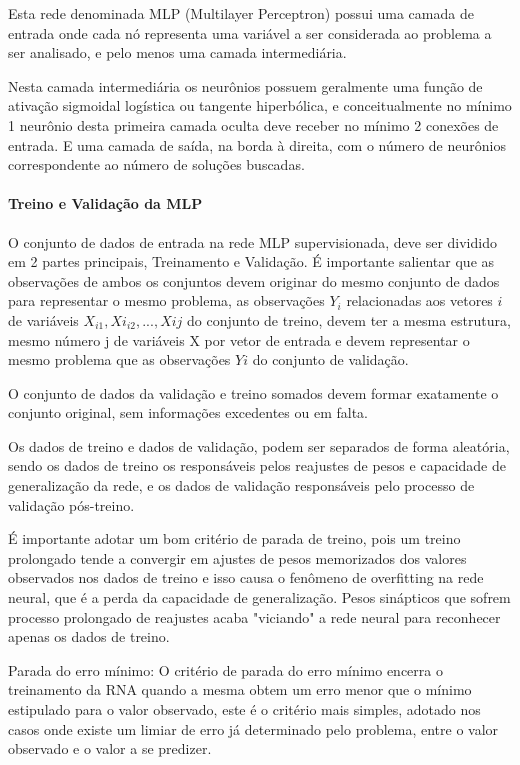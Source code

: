 \documentclass[	12pt, Times, openright, twoside, a4paper, english, brazil]{abntex2}
\begin{document}
  	       Esta rede denominada MLP (Multilayer Perceptron) possui uma camada de entrada onde cada nó representa uma variável a ser considerada ao problema a ser analisado, e pelo menos uma camada intermediária.
  	      
  	       Nesta camada intermediária os neurônios possuem geralmente uma função de ativação sigmoidal logística ou tangente hiperbólica, e conceitualmente no mínimo 1 neurônio desta primeira camada oculta deve receber no mínimo 2 conexões de entrada. E uma camada de saída, na borda à direita, com o número de neurônios correspondente ao número de soluções buscadas. 
  	       
            \paragraph{Treino e Validação da MLP}
            	O conjunto de dados de entrada na rede MLP supervisionada, deve ser dividido em 2 partes principais, Treinamento e Validação. É importante salientar que as observações de ambos os conjuntos devem originar do mesmo conjunto de dados para representar o mesmo problema, as observações $Y_i$ relacionadas aos vetores $i$ de variáveis $X_{i1},Xi_{i2},...,X{ij}$ do conjunto de treino, devem ter a mesma estrutura, mesmo número j de variáveis X por vetor de entrada e devem representar o mesmo problema que as observações $Yi$ do conjunto de validação.
            	
            	O conjunto de dados da validação e treino somados devem formar exatamente o conjunto original, sem informações excedentes ou em falta.
            	
            	Os dados de treino e dados de validação, podem ser separados de forma aleatória, sendo os dados de treino os responsáveis pelos reajustes de pesos e capacidade de generalização da rede, e os dados de validação responsáveis pelo processo de validação pós-treino.
            	
            	É importante adotar um bom critério de parada de treino, pois um treino prolongado tende a convergir em ajustes de pesos memorizados dos valores observados nos dados de treino e isso causa o fenômeno de overfitting na rede neural, que é a perda da capacidade de generalização. Pesos sinápticos que sofrem processo prolongado de reajustes acaba "viciando" a rede neural para reconhecer apenas os dados de treino.
            	
            	Parada do erro mínimo:
            	O critério de parada do erro mínimo encerra o treinamento da RNA quando a mesma obtem um erro menor que o mínimo estipulado para o valor observado, este é o critério mais simples, adotado nos casos onde existe um limiar de erro já determinado pelo problema, entre o valor observado e o valor a se predizer.
            	
\end{document}
